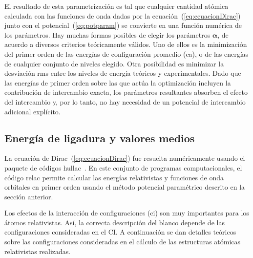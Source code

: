El resultado de esta parametrización es tal que cualquier cantidad 
atómica calculada con las funciones de onda dadas por la 
ecuación~(\ref{eq:ecuacionDirac}) junto con el potencial~(\ref{eq:potparam})
se convierte en una función numérica de los parámetros. Hay muchas 
formas posibles de elegir los parámetros $\boldsymbol{\alpha}$, de acuerdo 
a diversos criterios teóricamente válidos. Uno de ellos es la 
minimización del primer orden de las energías de configuración promedio
(\acs{ca}), o de las energías de cualquier conjunto de niveles elegido. 
Otra posibilidad es minimizar la desviación \acs{rms} entre los niveles 
de energía teóricos y experimentales. Dado que las energías de primer 
orden sobre las que actúa la optimización incluyen la contribución de 
intercambio exacta, los parámetros resultantes absorben el efecto del 
intercambio y, por lo tanto, no hay necesidad de un potencial de 
intercambio adicional explícito.

\begin{comment}
El valor esperado de cualquier operador $\hat{A}$ viene dado por
\begin{equation}
 \langle \hat{A}\rangle =
\int_0^{\infty} \left[ P^*(r) \,\hat{A}\, P(r) + Q^*(r)\, \hat{A}\, Q(r)
\right]\,dr
 \label{eq:meanvalr}
\end{equation}
donde $P(r)$ y $Q(r)$ son los componentes fuerte y débil de los 
espinores de Dirac, respectivamente. Para los orbitales relativistas,
usamos la notación $nl\pm$, que significa $nl_j$, donde el índice 
$j=l\pm1/2$ se representa como $\pm$.
\end{comment}

\subsection{Energía de ligadura y valores medios}

La ecuación de Dirac~(\ref{eq:ecuacionDirac}) fue resuelta numéricamente 
usando el paquete de códigos {\sc hullac}~\cite{BarShalom:01}. En este 
conjunto de programas computacionales, el código {\sc relac} permite 
calcular las energías relativistas y funciones de onda orbitales en 
primer orden usando el método potencial paramétrico descrito en la 
sección anterior. 

Los efectos de la interacción de configuraciones (\acs{ci}) son muy 
importantes para los átomos relativistas. Así, la correcta descripción 
del blanco depende de las configuraciones consideradas en el CI. A 
continuación se dan detalles teóricos sobre las configuraciones 
consideradas en el cálculo de las estructuras atómicas relativistas 
realizadas.

